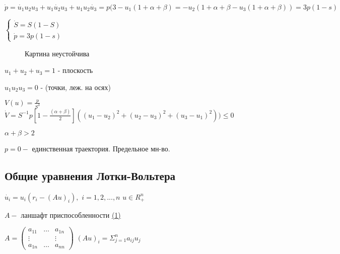 \vspace{0.5cm}
\(
\dot{p} = \dot{u_1}u_2u_3 + u_1\dot{u_2}u_3+u_1u_2\dot{u_3}=p(3-u_1(1+\alpha + \beta)=-u_2(1+\alpha+\beta - u_3(1+\alpha + \beta)) = 3p(1-s)
\)

\newpage
\(
	\begin{cases}
	\dot{S} = S(1-S)
	\\
	\dot{p} = 3p(1-s)
	\end{cases}
\)

\begin{figure} [h!]
			\caption{Картина неустойчива}	
\end{figure}

\vspace{0.5cm}
\(
u_1 + u_2 +u_3 = 1
\) - плоскость

\vspace{0.5cm}
\(
u_1u_2u_3 = 0
\) - (точки, леж. на осях)

\vspace{0.5cm}
\(
V(u) = \frac{p}{S^3}
\) \hspace{0.2cm}
\(
\dot{V} = S^{-1}p \left[ 1 - \frac{(\alpha + \beta)}{2} \right]((u_1 - u_2)^2 + (u_2-u_3)^2 +(u_3-u_1)^2))\leq 0
\)

\vspace{0.5cm}
\(
\alpha + \beta > 2
\)

\vspace{0.5cm}
\(
 p = 0 - 
\) единственная траектория. Предельное мн-во.

\vspace{0.5cm}
\subsection{Общие уравнения Лотки-Вольтера}


\vspace{0.5cm}
\(
\dot{u_i} = u_i(r_i-(Au)_i) , 
\)\hspace{0.2cm}
\(
i = 1,2,...,n
\)
\hspace{0.2cm}
\(
u \in R_+^n
\)


\vspace{0.5cm}
\(
A - 
\) ланшафт приспособленности \underline{(1)}


\vspace{0.5cm}
\(
A = 
	\begin{pmatrix}
	a_11 & \ldots & a_{1n} \\
	\vdots & & \vdots \\
	a_{1n} & \ldots & a_{nn}
	\end{pmatrix}
\)\hspace{0.7cm}
\(
(Au)_i = \Sigma_{j=1}^n a_{ij}u_j
\)

